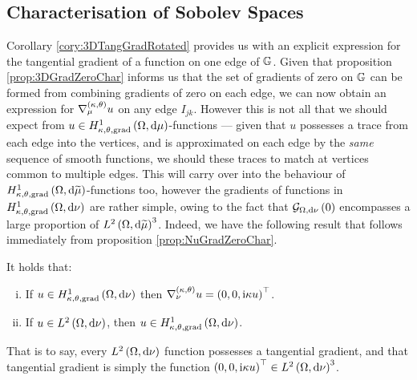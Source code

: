 \subsection{Characterisation of Sobolev Spaces}
Corollary \ref{cory:3DTangGradRotated} provides us with an explicit expression for the tangential gradient of a function on one edge of $\mathbb{G}$.
Given that proposition \ref{prop:3DGradZeroChar} informs us that the set of gradients of zero on $\mathbb{G}$ can be formed from combining gradients of zero on each edge, we can now obtain an expression for $\nabla^{\left( \kappa, \theta \right)}_{\mu}u$ on any edge $I_{jk}$.
However this is not all that we should expect from $u\in H^1_{\kappa,\theta,\mathrm{grad}}\left( \Omega, \mathrm{d}\mu \right)$-functions --- given that $u$ possesses a trace from each edge into the vertices, and is approximated on each edge by the \emph{same} sequence of smooth functions, we should these traces to match at vertices common to multiple edges.
This will carry over into the behaviour of $H^1_{\kappa,\theta,\mathrm{grad}}\left( \Omega, \mathrm{d}\widetilde{\mu} \right)$-functions too, however the gradients of functions in $H^1_{\kappa,\theta,\mathrm{grad}}\left( \Omega, \mathrm{d}\nu \right)$ are rather simple, owing to the fact that $\mathcal{G}_{ \Omega, \mathrm{d}\nu}\left( 0 \right)$ encompasses a large proportion of $L^{2}\left( \Omega,\mathrm{d} \widetilde{\mu} \right)^3$.
Indeed, we have the following result that follows immediately from proposition \ref{prop:NuGradZeroChar}.
\begin{cory} \label{cory:NuTangGradChar}
	It holds that:
	\begin{enumerate}[(i)]
		\item If $u\in H^1_{\kappa,\theta,\mathrm{grad}}\left( \Omega, \mathrm{d}\nu \right)$ then $\nabla^{\left( \kappa, \theta \right)}_{\nu}u = \left( 0,0,\mathrm{i}\kappa u \right)^\top$.
		\item If $u\in L^{2}\left( \Omega,\mathrm{d} \nu \right)$, then $u\in H^1_{\kappa,\theta,\mathrm{grad}}\left( \Omega, \mathrm{d}\nu \right)$.
	\end{enumerate}
\end{cory}
That is to say, every $L^{2}\left( \Omega,\mathrm{d} \nu \right)$ function possesses a tangential gradient, and that tangential gradient is simply the function $\left( 0,0,\mathrm{i}\kappa u \right)^\top\in L^{2}\left( \Omega,\mathrm{d} \nu \right)^3$.
